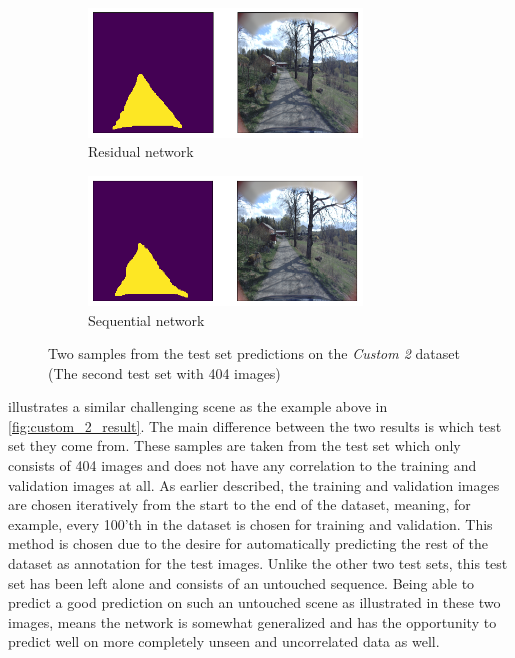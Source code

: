 \documentclass[USenglish]{ifimaster}  %
\begin{document}
\begin{figure}[ht]
\centering
\begin{subfigure}[b]{\textwidth}
\centering
\includegraphics[width=0.8\textwidth]{bilder/custom_2_exclusive/1938_res.png}
\caption{Residual network}
\label{fig:custom_2_2_res}
\end{subfigure}
\hfill
\begin{subfigure}[b]{\textwidth}
\centering
\includegraphics[width=0.8\textwidth]{bilder/custom_2_exclusive/1938_seq.png}
\caption{Sequential network}
\label{fig:custom_2_2_seq}
\end{subfigure}
\caption{Two samples from the test set predictions on the \textit{Custom 2} dataset (The second test set with 404 images)}
\label{fig:custom_2_result_404}
\end{figure}

 illustrates a similar challenging scene as the example above in \cref{fig:custom_2_result}. The main difference between the two results is which test set they come from. These samples are taken from the test set which only consists of 404 images and does not have any correlation to the training and validation images at all. As earlier described, the training and validation images are chosen iteratively from the start to the end of the dataset, meaning, for example, every 100'th in the dataset is chosen for training and validation. This method is chosen due to the desire for automatically predicting the rest of the dataset as annotation for the test images. Unlike the other two test sets, this test set has been left alone and consists of an untouched sequence. Being able to predict a good prediction on such an untouched scene as illustrated in these two images, means the network is somewhat generalized and has the opportunity to predict well on more completely unseen and uncorrelated data as well.
\end{document}
